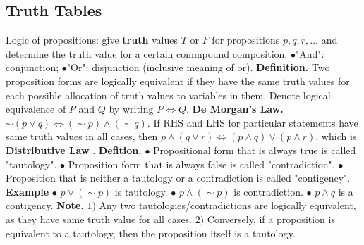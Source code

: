 \documentclass{article}
\begin{document}
\subsection{Truth Tables}
Logic of propositions: give \textbf{ truth } values $T$ or $F$ for propositions $p, q, r, \dots$ and determine the truth value for a certain commpound composition.
\newline
{}
\newline
\newline
$\bullet $"And": conjunction; 
\newline
$\bullet $"Or": disjunction (inclusive meaning of or). 
\newline
{}
\newline
\newline
\textbf{Definition. } Two proposition forms are logically equivalent if they have the same truth values for each possible allocation of truth values to variables in them.
\newline
Denote logical equivalence of $P$ and $Q$ by writing $P \Longleftrightarrow Q.$
\newline
\newline
\textbf{De Morgan's Law. } $\sim(p \vee q) \Longleftrightarrow (\sim p) \land (\sim q).$
\newline
{}
\newline
\newline
If RHS and LHS for particular statements have same truth values in all cases, then $p \land (q \vee r) \Longleftrightarrow (p \land q) \vee (p \land r).$ which is \textbf{ Distributive Law }.
\newline
\newline
\textbf{Defition. } 
\newline
$\bullet $ Propositional form that is always true is called "tautology". 
\newline
$\bullet $ Proposition form that is always false is called "contradiction".  
\newline
$\bullet $ Proposition that is neither a tautology or a contradiction is called "contigency".
\newline
\newline
\textbf{Example }
\newline
$\bullet $ $p \vee (\sim p)$ is tautology.
\newline
$\bullet $ $p \land (\sim p)$ is contradiction.
\newline
$\bullet $ $p \land q$ is a contigency.
\newline
\newline
\textbf{Note. }
\newline
\newline
$1) $ Any two tautologies/contradictions are logically equivalent, as they have same truth value for all cases.
\newline
$2) $ Conversely, if a proposition is equivalent to a tautology, then the proposition itself is a tautology.
\newpage
\end{document}
